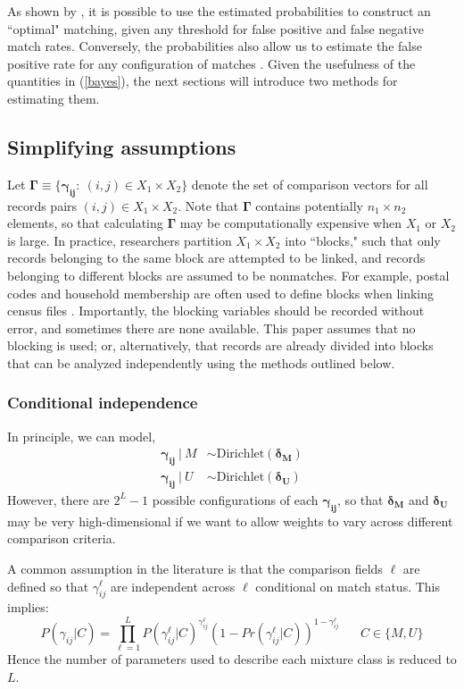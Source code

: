 \documentclass[12pt]{article}
\newcommand\gamij{\mathbf{\gamma_{ij}}}
\begin{document}
As shown by \cite{fellegi69}, it is possible to use the estimated probabilities to construct an ``optimal" matching, given any threshold for false positive and false negative match rates.  Conversely, the probabilities also allow us to estimate the false positive rate for any configuration of matches \citep{bda3}.  Given the usefulness of the quantities in (\ref{bayes}), the next sections will introduce two methods for estimating them.

\subsection{Simplifying assumptions}

Let $\mathbf{\Gamma} \equiv \{\mathbf{\gamma_{ij}}: \  (i,j) \in X_1\times X_2\}$ denote the set of comparison vectors for all records pairs $(i,j) \in X_1\times X_2$.   Note that $\mathbf{\Gamma}$ contains potentially $n_1 \times n_2$ elements, so that calculating $\mathbf{\Gamma}$ may be computationally expensive when $X_1$ or $X_2$ is large.  In practice, researchers partition $X_1\times X_2$ into ``blocks," such that only records belonging to the same block are attempted to be linked, and records belonging to different blocks are assumed to be nonmatches.  For example, postal codes and household membership are often used to define blocks when linking census files \citep{herzog2007}.  Importantly, the blocking variables should be recorded without error, and sometimes there are none available. 
This paper assumes that no blocking is used; or, alternatively, that records are already divided into blocks that can be analyzed independently using the methods outlined below.  

\subsubsection*{Conditional independence} In principle, we can model,
\begin{align*} \gamij\  |\  M &\sim \text{Dirichlet}(\mathbf{\delta_M})\\
\gamij\  |\  U &\sim \text{Dirichlet}(\mathbf{\delta_U}) \end{align*}
However, there are $2^{L}-1$ possible configurations of each $\gamij$, so that $\mathbf{\delta_M}$ and $\mathbf{\delta_U}$ may be very high-dimensional if we want to allow weights to vary across different comparison criteria.

A common assumption in the literature is that the comparison fields $\ell$ are defined so that $\gamma_{ij}^{\ell}$ are independent across $\ell$ conditional on match status.  This implies:
 \begin{equation} 
 P(\gamma_{ij} | C) = \prod_{\ell=1}^L P(\gamma_{ij}^{\ell} | C)^{\gamma_{ij}^{\ell}}(1-Pr(\gamma_{ij}^{\ell} | C))^{1-\gamma_{ij}^{\ell}} \hspace{20pt} C\in \{M, U\} 
 \label{eq:condInd}
 \end{equation}
Hence the number of parameters used to describe each mixture class is reduced to $L$.  
\end{document}
